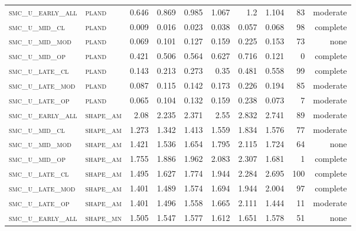 \begin{landscape}
\begin{center}
\begin{footnotesize}
\begin{longtable}{llrrrrr|rrr}
\textsc{smc\_u\_early\_all} & \textsc{pland     }   & 0.646    & 0.869    & 0.985    & 1.067    & 1.2      & 1.104    & 83  & moderate \\
\textsc{smc\_u\_mid\_cl   } & \textsc{pland     }   & 0.009    & 0.016    & 0.023    & 0.038    & 0.057    & 0.068    & 98  & complete \\
\textsc{smc\_u\_mid\_mod  } & \textsc{pland     }   & 0.069    & 0.101    & 0.127    & 0.159    & 0.225    & 0.153    & 73  & none     \\
\textsc{smc\_u\_mid\_op   } & \textsc{pland     }   & 0.421    & 0.506    & 0.564    & 0.627    & 0.716    & 0.121    & 0   & complete \\
\textsc{smc\_u\_late\_cl  } & \textsc{pland     }   & 0.143    & 0.213    & 0.273    & 0.35     & 0.481    & 0.558    & 99  & complete \\
\textsc{smc\_u\_late\_mod } & \textsc{pland     }   & 0.087    & 0.115    & 0.142    & 0.173    & 0.226    & 0.194    & 85  & moderate \\
\textsc{smc\_u\_late\_op  } & \textsc{pland     }   & 0.065    & 0.104    & 0.132    & 0.159    & 0.238    & 0.073    & 7   & moderate \\
\textsc{smc\_u\_early\_all} & \textsc{shape\_am }   & 2.08     & 2.235    & 2.371    & 2.55     & 2.832    & 2.741    & 89  & moderate \\
\textsc{smc\_u\_mid\_cl   } & \textsc{shape\_am }   & 1.273    & 1.342    & 1.413    & 1.559    & 1.834    & 1.576    & 77  & moderate \\
\textsc{smc\_u\_mid\_mod  } & \textsc{shape\_am }   & 1.421    & 1.536    & 1.654    & 1.795    & 2.115    & 1.724    & 64  & none     \\
\textsc{smc\_u\_mid\_op   } & \textsc{shape\_am }   & 1.755    & 1.886    & 1.962    & 2.083    & 2.307    & 1.681    & 1   & complete \\
\textsc{smc\_u\_late\_cl  } & \textsc{shape\_am }   & 1.495    & 1.627    & 1.774    & 1.944    & 2.284    & 2.695    & 100 & complete \\
\textsc{smc\_u\_late\_mod } & \textsc{shape\_am }   & 1.401    & 1.489    & 1.574    & 1.694    & 1.944    & 2.004    & 97  & complete \\
\textsc{smc\_u\_late\_op  } & \textsc{shape\_am }   & 1.401    & 1.496    & 1.558    & 1.665    & 2.111    & 1.444    & 11  & moderate \\
\textsc{smc\_u\_early\_all} & \textsc{shape\_mn }   & 1.505    & 1.547    & 1.577    & 1.612    & 1.651    & 1.578    & 51  & none     \\

\end{longtable}
\end{footnotesize}
\end{center}
\end{landscape}

